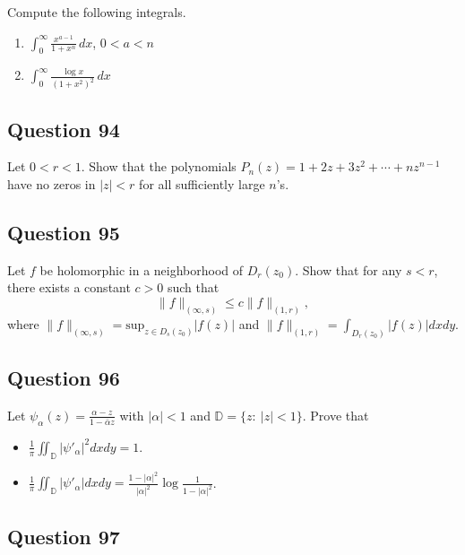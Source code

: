 \documentclass[12pt]{article}
\begin{document}
Compute the following integrals.

\begin{enumerate}
\def\labelenumi{(\roman{enumi})}
\item
  \(\displaystyle \int_0^\infty \frac{x^{a-1}}{1 + x^n} \, dx\),
  \(0< a < n\)
\item
  \(\displaystyle \int_0^\infty \frac{\log x}{(1 + x^2)^2}\, dx\)
\end{enumerate}

\hypertarget{question-94-1}{%
\subsection{Question 94}\label{question-94-1}}

Let \(0<r<1\). Show that the polynomials
\(P_n(z) = 1 + 2z + 3 z^2 + \cdots + n z^{n-1}\) have no zeros in
\(|z|<r\) for all sufficiently large \(n\)'s.

\hypertarget{question-95-1}{%
\subsection{Question 95}\label{question-95-1}}

Let \(f\) be holomorphic in a neighborhood of \(D_r(z_0)\). Show that
for any \(s<r\), there exists a constant \(c>0\) such that
\[\|f\|_{(\infty, s)} \leq c \|f\|_{(1, r)},\] where
\(\displaystyle \|f\|_{(\infty, s)} = \text{sup}_{z \in D_s(z_0)}|f(z)|\)
and \(\displaystyle \|f\|_{(1, r)} = \int_{D_r(z_0)} |f(z)|dx dy\).

\hypertarget{question-96-1}{%
\subsection{Question 96}\label{question-96-1}}

Let \(\displaystyle{\psi_{\alpha}(z)=\frac{\alpha-z}{1-\bar{\alpha}z}}\)
with \(|\alpha|<1\) and \({\mathbb D}=\{z:\ |z|<1\}\). Prove that

\begin{itemize}
\item
  \(\displaystyle{\frac{1}{\pi}\iint_{{\mathbb D}} |\psi'_{\alpha}|^2 dx dy =1}\).
\item
  \(\displaystyle{\frac{1}{\pi}\iint_{{\mathbb D}} |\psi'_{\alpha}| dx dy =\frac{1-|\alpha|^2}{|\alpha|^2} \log \frac{1}{1-|\alpha|^2}}\).
\end{itemize}

\hypertarget{question-97-1}{%
\subsection{Question 97}\label{question-97-1}}
\end{document}
